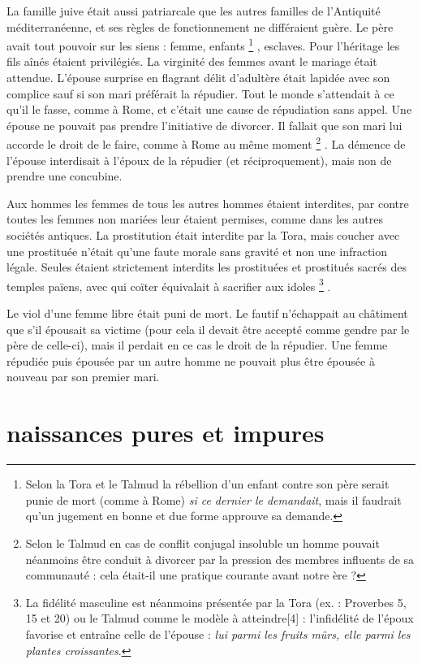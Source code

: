  La famille juive était aussi patriarcale que les autres familles de l'Antiquité méditerranéenne, et ses règles de fonctionnement ne différaient guère. Le père avait tout pouvoir sur les siens : femme, enfants%
\footnote{Selon la Tora et le Talmud la rébellion d'un enfant contre son père serait punie de mort (comme à Rome) \emph{si ce dernier le demandait}, mais il faudrait qu'un jugement en bonne et due forme approuve sa demande.}%
, esclaves. Pour l'héritage les fils aînés étaient privilégiés. La virginité des femmes avant le mariage était attendue. L'épouse surprise en flagrant délit d'adultère était lapidée avec son complice sauf si son mari préférait la répudier. Tout le monde s'attendait à ce qu'il le fasse, comme à Rome, et c'était une cause de répudiation sans appel. Une épouse ne pouvait pas prendre l'initiative de divorcer. Il fallait que son mari lui accorde le droit de le faire, comme à Rome au même moment%
\footnote{Selon le Talmud en cas de conflit conjugal insoluble un homme pouvait néanmoins être conduit à divorcer par la pression des membres influents de sa communauté : cela était-il une pratique courante avant notre ère ?}%
. La démence de l'épouse interdisait à l'époux de la répudier (et réciproquement), mais non de prendre une concubine. 

 Aux hommes les femmes de tous les autres hommes étaient interdites, par contre toutes les femmes non mariées leur étaient permises, comme dans les autres sociétés antiques. La prostitution était interdite par la Tora, mais coucher avec une prostituée n'était qu'une faute morale sans gravité et non une infraction légale. Seules étaient strictement interdits les prostituées et prostitués sacrés des temples païens, avec qui coïter équivalait à sacrifier aux idoles%
\footnote{La fidélité masculine est néanmoins présentée par la Tora (ex. : Proverbes 5, 15 et 20) ou le Talmud comme le modèle à atteindre[4] : l'infidélité de l'époux favorise et entraîne celle de l'épouse : \emph{lui parmi les fruits mûrs, elle parmi les plantes croissantes}.}%
. 

 Le viol d'une femme libre était puni de mort. Le fautif n'échappait au châtiment que s'il épousait sa victime (pour cela il devait être accepté comme gendre par le père de celle-ci), mais il perdait en ce cas le droit de la répudier. Une femme répudiée puis épousée par un autre homme ne pouvait plus être épousée à nouveau par son premier mari. 


\section{ naissances pures et impures}

